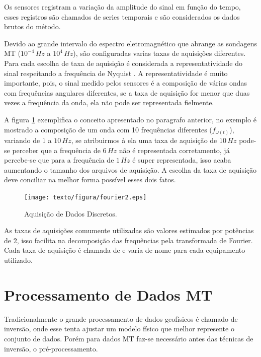         Os sensores registram a variação da amplitude do sinal em função do tempo, esses registros são chamados de series temporais e são considerados os dados brutos do método. 
        
        Devido ao grande intervalo do espectro eletromagnético que abrange as sondagens MT ($10^{-4}\, Hz$ a $10^{4}\, Hz$), são configuradas varias taxas de aquisições diferentes. Para cada escolha de taxa de aquisição é considerada a representatividade do sinal respeitando a frequência de Nyquist \cite{nyquist28}. A representatividade é muito importante, pois, o sinal medido pelos sensores é a composição de várias ondas com frequências angulares diferentes, se a taxa de aquisição for menor que duas vezes a frequência da onda, ela não pode ser representada fielmente.  
        
        A figura \ref{fig-aquisicao} exemplifica o conceito apresentado no paragrafo anterior, no exemplo é mostrado a composição de um onda com 10 frequências diferentes ($f_{\omega(t)}$), variando de $1$ a $10\, Hz$, se atribuirmos à ela uma taxa de aquisição de $10\,Hz$ pode-se perceber que a frequência de $6\,Hz$ não é representada corretamento, já percebe-se que para a frequência de $1\,Hz$ é super representada, isso acaba aumentando o tamanho dos arquivos de aquisição. A escolha da taxa de aquisição deve conciliar na melhor forma possível esses dois fatos.
        
        \begin{figure}[H]
            \caption{Aquisição de Dados Discretos.}
                \begin{center}
                    \texttt{[image: texto/figura/fourier2.eps]}
                \end{center}
            \label{fig-aquisicao}
        \end{figure}
    
        As taxas de aquisições comumente utilizadas são valores estimados por potências de 2, isso facilita na decomposição das frequências pela transformada de Fourier. Cada taxa de aquisição é chamada de  e varia de nome para cada equipamento utilizado. 
    
    \section{Processamento de Dados MT}
        Tradicionalmente o grande processamento de dados geofísicos é chamado de inversão, onde esse tenta ajustar um modelo físico que melhor represente o conjunto de dados. Porém para dados MT faz-se necessário antes das técnicas de inversão, o pré-processamento.
        
